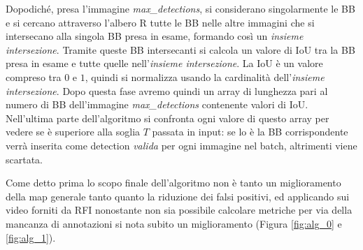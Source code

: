 Dopodiché, presa l'immagine \textit{max\_detections}, si considerano singolarmente le \ac{BB} e si cercano attraverso l'albero R tutte le \ac{BB} nelle altre immagini che si intersecano alla singola \ac{BB} presa in esame, formando così un \textit{insieme intersezione}. 
Tramite queste \ac{BB} intersecanti si calcola un valore di \ac{IoU} tra la \ac{BB} presa in esame e tutte quelle nell'\textit{insieme intersezione}. La \ac{IoU} è un valore compreso tra $0$ e $1$, quindi si normalizza usando la cardinalità dell'\textit{insieme intersezione}.
Dopo questa fase avremo quindi un array di lunghezza pari al numero di \ac{BB} dell'immagine \textit{max\_detections} contenente valori di \ac{IoU}.
Nell'ultima parte dell'algoritmo si confronta ogni valore di questo array per vedere se è superiore alla soglia $T$ passata in input: se lo è la \ac{BB} corrispondente verrà inserita come detection \textit{valida} per ogni immagine nel batch, altrimenti viene scartata.

Come detto prima lo scopo finale dell'algoritmo non è tanto un miglioramento della \ac{map} generale tanto quanto la riduzione dei falsi positivi, ed applicando sui video forniti da \ac{RFI} nonostante non sia possibile calcolare metriche per via della mancanza di annotazioni si nota subito un miglioramento (Figura \ref{fig:alg_0} e \ref{fig:alg_1}).


